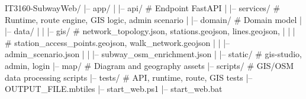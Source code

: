 IT3160-SubwayWeb/
|-- app/
|   |-- api/                # Endpoint FastAPI
|   |-- services/           # Runtime, route engine, GIS logic, admin scenario
|   |-- domain/             # Domain model
|   |-- data/
|   |   |-- gis/            # network_topology.json, stations.geojson, lines.geojson,
|   |   |                   # station_access_points.geojson, walk_network.geojson
|   |   |-- admin_scenario.json
|   |   |-- subway_osm_enrichment.json
|   |-- static/             # gis-studio, admin, login
|-- map/                    # Diagram and geography assets
|-- scripts/                # GIS/OSM data processing scripts
|-- tests/                  # API, runtime, route, GIS tests
|-- OUTPUT_FILE.mbtiles
|-- start_web.ps1
|-- start_web.bat
